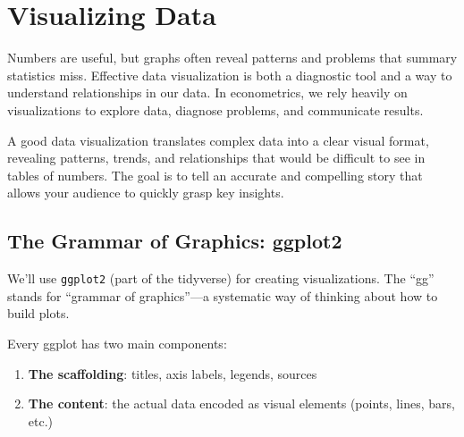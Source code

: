 \documentclass[
  letterpaper,
  DIV=11,
  numbers=noendperiod]{scrreprt}
\providecommand{\tightlist}{%
  \setlength{\itemsep}{0pt}\setlength{\parskip}{0pt}}
\begin{document}
\section{Visualizing Data}\label{visualizing-data}

Numbers are useful, but graphs often reveal patterns and problems that
summary statistics miss. Effective data visualization is both a
diagnostic tool and a way to understand relationships in our data. In
econometrics, we rely heavily on visualizations to explore data,
diagnose problems, and communicate results.

\begin{tcolorbox}[enhanced jigsaw, arc=.35mm, bottomrule=.15mm, bottomtitle=1mm, breakable, colback=white, colbacktitle=quarto-callout-important-color!10!white, colframe=quarto-callout-important-color-frame, coltitle=black, left=2mm, leftrule=.75mm, opacityback=0, opacitybacktitle=0.6, rightrule=.15mm, title=\textcolor{quarto-callout-important-color}{\faExclamation}\hspace{0.5em}{Why Visualization Matters}, titlerule=0mm, toprule=.15mm, toptitle=1mm]

A good data visualization translates complex data into a clear visual
format, revealing patterns, trends, and relationships that would be
difficult to see in tables of numbers. The goal is to tell an accurate
and compelling story that allows your audience to quickly grasp key
insights.

\end{tcolorbox}

\subsection{The Grammar of Graphics:
ggplot2}\label{the-grammar-of-graphics-ggplot2}

We'll use \texttt{ggplot2} (part of the tidyverse) for creating
visualizations. The ``gg'' stands for ``grammar of graphics''---a
systematic way of thinking about how to build plots.

Every ggplot has two main components:

\begin{enumerate}
\def\labelenumi{\arabic{enumi}.}
\tightlist
\item
  \textbf{The scaffolding}: titles, axis labels, legends, sources
\item
  \textbf{The content}: the actual data encoded as visual elements
  (points, lines, bars, etc.)
\end{enumerate}
\end{document}
